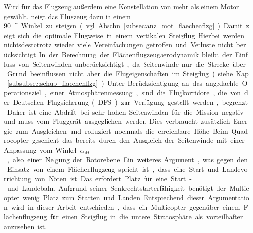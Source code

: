 Wird für das Flugzeug außerdem eine Konstellation von mehr als einem Motor gewählt, neigt das Flugzeug dazu in einem \SI{90}{^\circ} Winkel zu steigen (vgl. Abschn. \ref{subsec:anz_mot_flaechenflzg}). Damit zeigt sich die optimale Flugweise in einem vertikalen Steigflug. Hierbei werden nichtsdestotrotz wieder viele Vereinfachungen getroffen und Verluste nicht berücksichtigt. 
In der Berechnung der Flächenflugzeugaerodynamik bleibt der Einfluss von Seitenwinden unberücksichtigt, da Seitenwinde nur die Strecke über Grund beeinflussen nicht aber die Flugeigenschaften im Steigflug (siehe Kap. \ref{subsubsec:schub_flaechenflzg}). Unter Berücksichtigung an das angedachte Operationsziel, einer Atmosphärenmessung, sind die Flugkorridore, die von der Deutschen Flugsicherung (DFS) zur Verfügung gestellt werden, begrenzt. Daher ist eine Abdrift bei sehr hohen Seitenwinden für die Mission negativ und muss vom Fluggerät ausgeglichen werden. Dies verbraucht zusätzlich Energie zum Ausgleichen und reduziert nochmals die erreichbare Höhe. Beim Quadrocopter geschieht das bereits durch den Ausgleich der Seitenwinde mit einer Anpassung vom Winkel \ensuremath{\alpha_{M}}, also einer Neigung der Rotorebene. Ein weiteres Argument, was gegen den Einsatz von einem Flächenflugzeug spricht ist, dass eine Start und Landevorrichtung von Nöten ist. Das erfordert Platz für eine Start- und Landebahn. Aufgrund seiner Senkrechtstarterfähigkeit benötigt der Multicopter wenig Platz zum Starten und Landen. 
Entsprechend dieser Argumentation wird in dieser Arbeit entschieden, dass ein Multicopter gegenüber einem Flächenflugzeug für einen Steigflug in die untere Stratosphäre als vorteilhafter anzusehen ist.